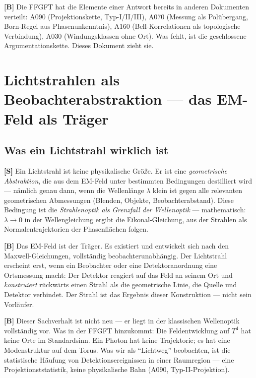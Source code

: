 \textbf{[B]} Die FFGFT hat die Elemente einer Antwort bereits in anderen
Dokumenten verteilt: A090 (Projektionskette, Typ-I/II/III), A070
(Messung als Polübergang, Born-Regel aus Phasenunkenntnis), A160
(Bell-Korrelationen als topologische Verbindung), A030 (Windungsklassen
ohne Ort). Was fehlt, ist die geschlossene Argumentationskette.
Dieses Dokument zieht sie.

\section{Lichtstrahlen als Beobachterabstraktion --- das EM-Feld als Träger}
\label{sec:lichtstrahlen}

\subsection{Was ein Lichtstrahl wirklich ist}

\textbf{[S]} Ein Lichtstrahl ist keine physikalische Größe. Er ist eine
\emph{geometrische Abstraktion}, die aus dem EM-Feld unter bestimmten
Bedingungen destilliert wird --- nämlich genau dann, wenn die Wellenlänge
$\lambda$ klein ist gegen alle relevanten geometrischen Abmessungen
(Blenden, Objekte, Beobachterabstand). Diese Bedingung ist die
\emph{Strahlenoptik als Grenzfall der Wellenoptik} --- mathematisch:
$\lambda \to 0$ in der Wellengleichung ergibt die Eikonal-Gleichung,
aus der Strahlen als Normalentrajektorien der Phasenflächen folgen.

\textbf{[B]} Das EM-Feld ist der Träger. Es existiert und entwickelt
sich nach den Maxwell-Gleichungen, vollständig beobachterunabhängig.
Der Lichtstrahl erscheint erst, wenn ein Beobachter oder eine Detektoranordnung
eine Ortsmessung macht: Der Detektor reagiert auf das Feld an seinem Ort
und \emph{konstruiert} rückwärts einen Strahl als die geometrische Linie,
die Quelle und Detektor verbindet. Der Strahl ist das Ergebnis dieser
Konstruktion --- nicht sein Vorläufer.

\textbf{[B]} Dieser Sachverhalt ist nicht neu --- er liegt in der
klassischen Wellenoptik vollständig vor. Was in der FFGFT hinzukommt:
Die Feldentwicklung auf $T^4$ hat keine Orte im Standardsinn. Ein Photon
hat keine Trajektorie; es hat eine Modenstruktur auf dem Torus. Was wir
als ``Lichtweg'' beobachten, ist die statistische Häufung von
Detektionsereignissen in einer Raumregion --- eine Projektionststatistik,
keine physikalische Bahn (A090, Typ-II-Projektion).

